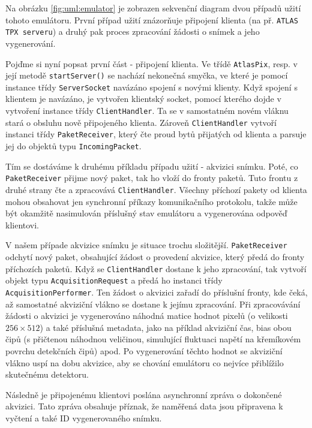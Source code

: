 Na obrázku \ref{fig:uml:emulator} je zobrazen sekvenční diagram dvou případů užití tohoto emulátoru. První případ užití znázorňuje připojení klienta (na př. \texttt{ATLAS TPX serveru}) a druhý pak proces zpracování žádosti o snímek a jeho vygenerování.

Pojďme si nyní popsat první část - připojení klienta. Ve třídě \texttt{AtlasPix}, resp. v její metodě \texttt{startServer()} se nachází nekonečná smyčka, ve které je pomocí instance třídy \texttt{ServerSocket} navázáno spojení s novými klienty. Když spojení s klientem je navázáno, je vytvořen klientský socket, pomocí kterého dojde v vytvoření instance třídy \texttt{ClientHandler}. Ta se v samostatném novém vláknu stará o obsluhu nově připojeného klienta. Zároveň \texttt{ClientHandler} vytvoří instanci třídy \texttt{PaketReceiver}, který čte proud bytů přijatých od klienta a parsuje jej do objektů typu \texttt{IncomingPacket}.

Tím se dostáváme k druhému příkladu případu užití - akvizici snímku. Poté, co \texttt{PaketReceiver} přijme nový paket, tak ho vloží do fronty paketů. Tuto frontu z druhé strany čte a zpracovává \texttt{ClientHandler}. Všechny příchozí pakety od klienta mohou obsahovat jen synchronní příkazy komunikačního protokolu, takže může být okamžitě nasimulován příslušný stav emulátoru a vygenerována odpověď klientovi. 

V našem případe akvizice snímku je situace trochu složitější. \texttt{PaketReceiver} odchytí nový paket, obsahující žádost o provedení akvizice, který předá do fronty příchozích paketů. Když se \texttt{ClientHandler} dostane k jeho zpracování, tak vytvoří objekt typu \texttt{AcquisitionRequest} a předá ho instanci třídy \texttt{AcquisitionPerformer}. Ten žádost o akvizici zařadí do příslušní fronty, kde čeká, až samostatné akviziční vlákno se dostane k jejímu zpracování. Při zpracovávání žádosti o akvizici je vygenerováno náhodná matice hodnot pixelů (o velikosti $256\times512$) a také příslušná metadata, jako na příklad akviziční čas, bias obou čipů (s přičtenou náhodnou veličinou, simulující fluktuaci napětí na křemíkovém povrchu detekčních čipů) apod. Po vygenerování těchto hodnot se akviziční vlákno uspí na dobu akvizice, aby se chování emulátoru co nejvíce přiblížilo skutečnému detektoru.

Následně je připojenému klientovi poslána asynchronní zpráva o dokončené akvizici. Tato zpráva obsahuje příznak, že naměřená data jsou připravena k vyčtení a také ID vygenerovaného snímku. 

